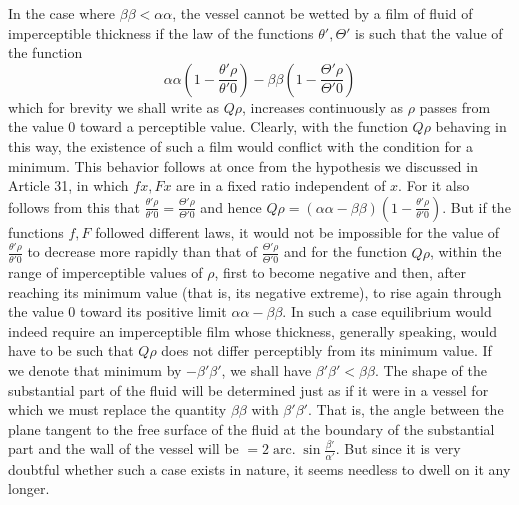 In the case where $\beta\beta<\alpha\alpha$, the vessel cannot be wetted by a film of fluid of imperceptible thickness if the law of the functions $\theta',\Theta'$ is such that the value of the function
\[
\alpha\alpha\left(1-\frac{\theta'\rho}{\theta'0}\right)-\beta\beta\left(1-\frac{\Theta'\rho}{\Theta'0}\right)
\]
which for brevity we shall write as $Q\rho$, increases continuously as $\rho$ passes from the value $0$ toward a perceptible value. Clearly, with the function $Q\rho$ behaving in this way, the existence of such a film would conflict with the condition for a minimum. This behavior follows at once from the hypothesis we discussed in Article 31, in which $fx,Fx$ are in a fixed ratio independent of $x$. For it also follows from this that $\frac{\theta'\rho}{\theta'0}=\frac{\Theta'\rho}{\Theta'0}$ and hence $Q\rho=(\alpha\alpha-\beta\beta)(1-\frac{\theta'\rho}{\theta'0})$. But if the functions $f,F$ followed different laws, it would not be impossible for the value of $\frac{\theta'\rho}{\theta'0}$ to decrease more rapidly than that of $\frac{\Theta'\rho}{\Theta'0}$ and for the function $Q\rho$, within the range of imperceptible values of $\rho$, first to become negative and then, after reaching its minimum value (that is, its negative extreme), to rise again through the value $0$ toward its positive limit $\alpha\alpha-\beta\beta$. In such a case equilibrium would indeed require an imperceptible film whose thickness, generally speaking, would have to be such that $Q\rho$ does not differ perceptibly from its minimum value. If we denote that minimum by $-\beta'\beta'$, we shall have $\beta'\beta'<\beta\beta$. The shape of the substantial part of the fluid will be determined just as if it were in a vessel for which we must replace the quantity $\beta\beta$ with $\beta'\beta'$. That is, the angle between the plane
tangent to the free surface of the fluid at the boundary of the substantial part and the wall of the vessel will be $=2\operatorname{arc.}\sin\frac{\beta'}{\alpha'}$. But since it is very doubtful whether such a case exists in nature, it seems needless to dwell on it any longer.

